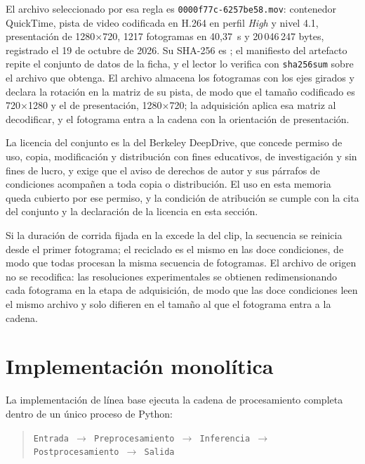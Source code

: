 El archivo seleccionado por esa regla es \texttt{0000f77c-6257be58.mov}:
contenedor QuickTime, pista de video codificada en H.264 en perfil
\emph{High} y nivel 4.1, presentación de 1280$\times$720, 1217 fotogramas en
40,37~s y 20\,046\,247 bytes, registrado el 19 de octubre de 2026. Su
SHA-256 es
\texttt{};
el manifiesto del artefacto repite el conjunto de datos de la ficha, y el
lector lo verifica con \texttt{sha256sum} sobre el archivo que obtenga. El
archivo almacena los fotogramas con los ejes girados y declara la rotación en
la matriz de su pista, de modo que el tamaño codificado es 720$\times$1280 y
el de presentación, 1280$\times$720; la adquisición aplica esa matriz al
decodificar, y el fotograma entra a la cadena con la orientación de
presentación.

La licencia del conjunto es la del Berkeley DeepDrive, que concede permiso de
uso, copia, modificación y distribución con fines educativos, de
investigación y sin fines de lucro, y exige que el aviso de derechos de autor
y sus párrafos de condiciones acompañen a toda copia o distribución. El uso
en esta memoria queda cubierto por ese permiso, y la condición de atribución
se cumple con la cita del conjunto y la declaración de la licencia en esta
sección.

Si la duración de corrida fijada en la  excede la del
clip, la secuencia se reinicia desde el primer fotograma; el reciclado es el
mismo en las doce condiciones, de modo que todas procesan la misma secuencia
de fotogramas. El archivo de origen no se recodifica: las resoluciones
experimentales se obtienen redimensionando cada fotograma en la etapa de
adquisición, de modo que las doce condiciones leen el mismo archivo y solo
difieren en el tamaño al que el fotograma entra a la cadena.

\section{Implementación monolítica}
\label{sec:monolithic}

La implementación de línea base ejecuta la cadena de procesamiento completa
dentro de un único proceso de Python:

\begin{quote}
\texttt{Entrada $\rightarrow$ Preprocesamiento $\rightarrow$ Inferencia
$\rightarrow$ Postprocesamiento $\rightarrow$ Salida}
\end{quote}

